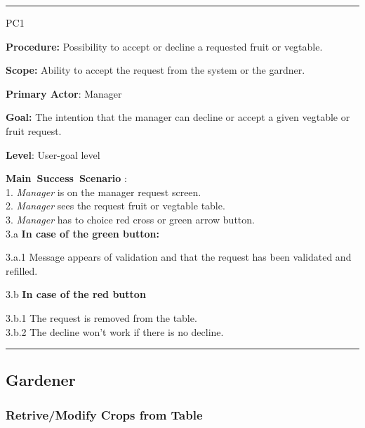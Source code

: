 \vspace{0.5cm}
\hrule
\hfill \break
\begin{lyxlist}{PC1}
\small{
\item [\textbf{Procedure:}] Possibility to accept or decline a requested fruit
or vegtable.
\item [\textbf{Scope:}] Ability to accept the request from the system or the
gardner.
\item [\textbf{Primary Actor}:] Manager
\item [\textbf{Goal:}] The intention that the manager can decline or accept a
given vegtable or fruit request.
\item [\textbf{Level}:] User-goal level
\item [\textbf{Main~Success~Scenario}]:\\
1. \emph{Manager} is on the manager request screen. \\
2. \emph{Manager} sees the request fruit or vegtable table.\\
3. \emph{Manager} has to choice red cross or green arrow button.\\
3.a \textbf{In case of the green button:}
 \begin{Tab}{2em} 3.a.1 Message appears of validation and that the request
 has been validated and refilled.\\
  \end{Tab}
3.b \textbf{In case of the red button}
\begin{Tab}{2em} 3.b.1 The request is removed from the table.\\
3.b.2 The decline won't work if there is no decline.
\end{Tab}
}
\end{lyxlist}
\hrule
\vspace{0.5cm}

\subsection{Gardener}
\subsubsection{Retrive/Modify Crops from Table}


